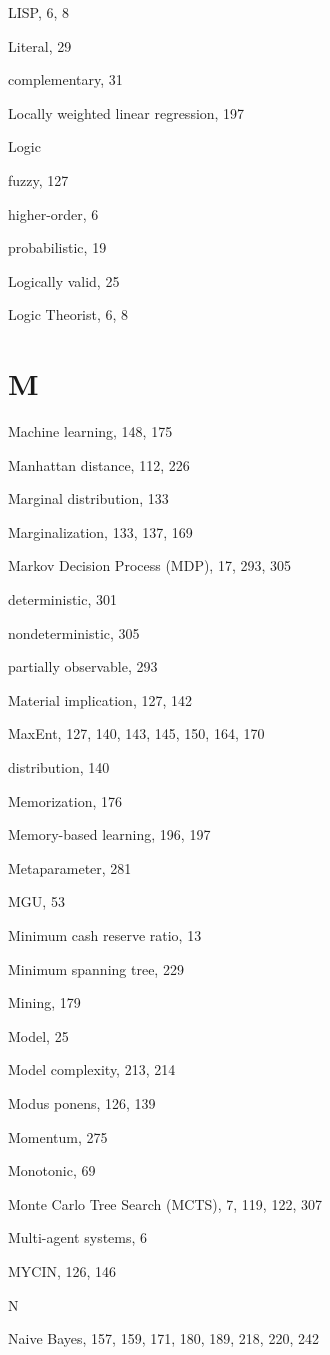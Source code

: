 \documentclass[10pt]{book}
\begin{document}
LISP, 6, 8

Literal, 29

complementary, 31

Locally weighted linear regression, 197

Logic

fuzzy, 127

higher-order, 6

probabilistic, 19

Logically valid, 25

Logic Theorist, 6, 8
\section{M}

Machine learning, 148, 175

Manhattan distance, 112, 226

Marginal distribution, 133

Marginalization, 133, 137, 169

Markov Decision Process (MDP), 17, 293, 305

deterministic, 301

nondeterministic, 305

partially observable, 293

Material implication, 127, 142

MaxEnt, 127, 140, 143, 145, 150, 164, 170

distribution, 140

Memorization, 176

Memory-based learning, 196, 197

Metaparameter, 281

MGU, 53

Minimum cash reserve ratio, 13

Minimum spanning tree, 229

Mining, 179

Model, 25

Model complexity, 213, 214

Modus ponens, 126, 139

Momentum, 275

Monotonic, 69

Monte Carlo Tree Search (MCTS), 7, 119, 122, 307

Multi-agent systems, 6

MYCIN, 126, 146

N

Naive Bayes, 157, 159, 171, 180, 189, 218, 220, 242
\end{document}
